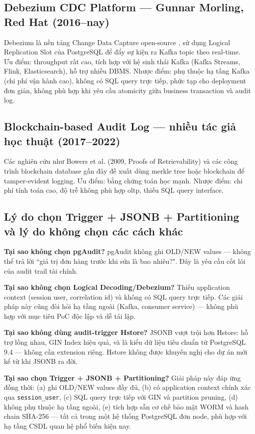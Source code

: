 \subsection{Debezium CDC Platform --- Gunnar Morling, Red Hat (2016--nay)}

Debezium là nền tảng Change Data Capture open-source \cite{Debezium}, sử dụng Logical Replication Slot của PostgreSQL để đẩy sự kiện ra Kafka topic theo real-time. Ưu điểm: throughput rất cao, tích hợp với hệ sinh thái Kafka (Kafka Streams, Flink, Elasticsearch), hỗ trợ nhiều DBMS. Nhược điểm: phụ thuộc hạ tầng Kafka (chi phí vận hành cao), không có SQL query trực tiếp, phức tạp cho deployment đơn giản, không phù hợp khi yêu cầu atomicity giữa business transaction và audit log.

\subsection{Blockchain-based Audit Log --- nhiều tác giả học thuật (2017--2022)}

Các nghiên cứu như Bowers et al. (2009, Proofs of Retrievability) và các công trình blockchain database gần đây đề xuất dùng merkle tree hoặc blockchain để tamper-evident logging. Ưu điểm: bằng chứng toán học mạnh. Nhược điểm: chi phí tính toán cao, độ trễ không phù hợp \ac{oltp}, thiếu SQL query interface.

\subsection{Lý do chọn Trigger + JSONB + Partitioning và lý do không chọn các cách khác}

\textbf{Tại sao không chọn pgAudit?} pgAudit không ghi OLD/NEW values --- không thể trả lời ``giá trị đơn hàng trước khi sửa là bao nhiêu?". Đây là yêu cầu cốt lõi của audit trail tài chính.

\textbf{Tại sao không chọn Logical Decoding/Debezium?} Thiếu application context (session user, correlation id) và không có SQL query trực tiếp. Các giải pháp này cũng đòi hỏi hạ tầng ngoài (Kafka, consumer service) --- không phù hợp với mục tiêu PoC độc lập và dễ tái lập.

\textbf{Tại sao không dùng audit-trigger Hstore?} JSONB vượt trội hơn Hstore: hỗ trợ lồng nhau, GIN Index hiệu quả, và là kiểu dữ liệu tiêu chuẩn từ PostgreSQL 9.4 --- không cần extension riêng. Hstore không được khuyến nghị cho dự án mới kể từ khi JSONB ra đời.

\textbf{Tại sao chọn Trigger + JSONB + Partitioning?} Giải pháp này đáp ứng đồng thời: (a) ghi OLD/NEW values đầy đủ, (b) có application context chính xác qua \texttt{session\_user}, (c) SQL query trực tiếp với GIN và partition pruning, (d) không phụ thuộc hạ tầng ngoài, (e) tích hợp sẵn cơ chế bảo mật WORM và hash chain SHA-256 --- tất cả trong một hệ thống PostgreSQL đơn node, phù hợp với hạ tầng CSDL quan hệ phổ biến hiện nay.

